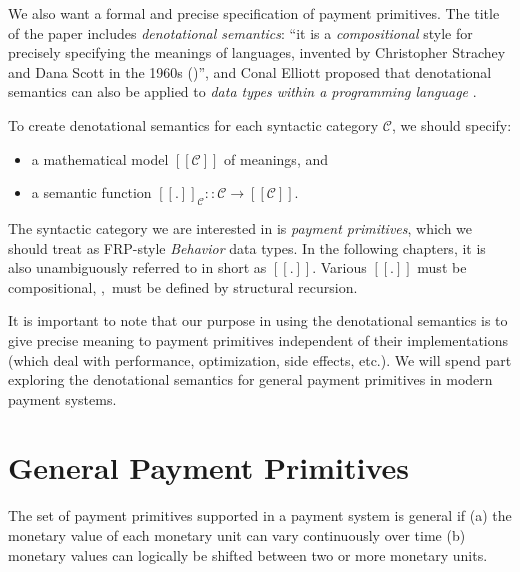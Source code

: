 We also want a formal and precise specification of payment primitives. The title of the paper
includes \textit{denotational semantics}: ``it is a \textit{compositional} style for precisely
specifying the meanings of languages, invented by Christopher Strachey and Dana Scott in the 1960s
(\cite{scott1971toward})'', and Conal Elliott proposed that denotational semantics can also be
applied to \textit{data types within a programming language}
.

To create denotational semantics for each syntactic category $\mathcal{C}$, we should specify:

\begin{itemize}
\item a mathematical model $[\![\mathcal{C}]\!]$ of meanings, and
\item a semantic function $[\![.]\!]_{\mathcal{C}} :: \mathcal{C} \rightarrow [\![\mathcal{C}]\!]$.
\end{itemize}

The syntactic category we are interested in is \textit{payment primitives}, which we should treat as
FRP-style \textit{Behavior} data types. In the following chapters, it is also unambiguously referred
to in short as $[\![.]\!]$. Various $[\![.]\!]$ must be compositional, \ie,\ must be defined by
structural recursion.

It is important to note that our purpose in using the denotational semantics is to give precise
meaning to payment primitives independent of their implementations (which deal with performance,
optimization, side effects, etc.). We will spend part \ref{part:gpp} exploring the denotational
semantics for general payment primitives in modern payment systems.

\part{General Payment Primitives}\label{part:gpp}

The set of payment primitives supported in a payment system is general if (a) the monetary value of
each monetary unit can vary continuously over time (b) monetary values can logically be shifted
between two or more monetary units.

